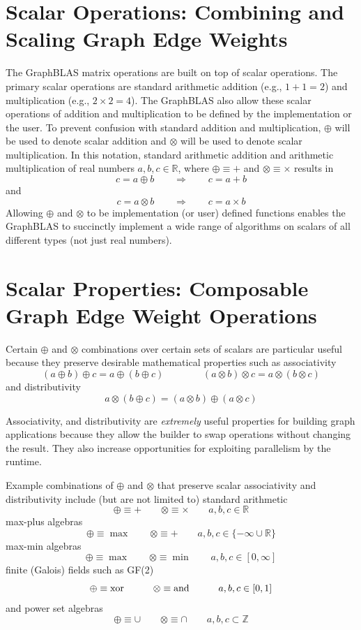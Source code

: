 \section{Scalar Operations: Combining and Scaling Graph Edge Weights}
  The GraphBLAS matrix operations are built on top of scalar operations.  The primary scalar operations are standard arithmetic addition (e.g., $1 + 1 = 2$) and multiplication (e.g., $2 \times 2 = 4$).  The GraphBLAS also allow these scalar operations of addition and multiplication to be defined by the implementation or the user.  To prevent confusion with standard addition and multiplication, $\oplus$ will be used to denote scalar addition and $\otimes$ will be used to denote scalar multiplication.  In this notation, standard arithmetic addition and arithmetic multiplication of real numbers $a, b, c \in \mathbb{R}$, where $\oplus \equiv +$ and $\otimes \equiv \times$ results in
$$
   c = a \oplus b  ~~~~~~~~~ \Rightarrow ~~~~~~~~~ c = a + b
$$
and
$$
   c = a \otimes b  ~~~~~~~~~ \Rightarrow ~~~~~~~~~ c = a \times b
$$
Allowing $\oplus$ and $\otimes$ to be implementation (or user) defined functions enables the GraphBLAS to succinctly implement a wide range of algorithms on scalars of all different types (not just real numbers).

\section{Scalar Properties: Composable Graph Edge Weight Operations}
  Certain $\oplus$ and $\otimes$ combinations  over certain sets of scalars are particular useful because they preserve desirable mathematical properties such as
associativity
$$
 (a \oplus b) \oplus c = a \oplus (b \oplus c) ~~~~~~~~~ ~~~~~~~~~ (a \otimes b) \otimes c = a \otimes (b \otimes c)
$$
and distributivity
$$
 a \otimes (b \oplus c)  = (a \otimes b) \oplus (a \otimes c)
$$

Associativity, and distributivity are \emph{extremely} useful properties for building graph applications because they allow the builder to swap operations without changing the result. They also increase opportunities for exploiting parallelism by the runtime. 

  Example combinations of $\oplus$ and $\otimes$ that preserve scalar associativity and distributivity include (but are not limited to) standard arithmetic
$$
  \oplus \equiv + ~~~~~~~~~ \otimes \equiv \times ~~~~~~~~~ a, b, c \in \mathbb{R}
$$
max-plus algebras
$$
  \oplus \equiv \max ~~~~~~~~~ \otimes \equiv + ~~~~~~~~~ a, b, c \in \{-\infty \cup \mathbb{R}\}
$$
max-min algebras
$$
  \oplus \equiv \max ~~~~~~~~~ \otimes \equiv \min ~~~~~~~~~ a, b, c \in [0,\infty]
$$
finite (Galois) fields such as GF(2)
$$
  \oplus \equiv {\rm xor} ~~~~~~~~~ \otimes \equiv {\rm and} ~~~~~~~~~ a, b, c \in [0,1]
$$
and power set algebras
$$
  \oplus \equiv \cup ~~~~~~~~~ \otimes \equiv \cap ~~~~~~~~~ a, b, c \subset \mathbb{Z}
$$

